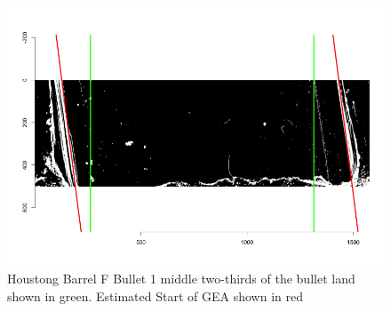 \documentclass[12pt]{article}
\theoremstyle{nonumberplain}
\begin{document}
\begin{figure}[!ht]
  \centering
  \includegraphics[width = .9\textwidth]{../images/Hamby_252_Bullet1_Land3_BestFit}
  \caption{Houstong Barrel F Bullet 1 middle two-thirds of the bullet land shown in green. Estimated Start of GEA shown in red}
  \label{fig: midtwothird}
\end{figure}
\end{document}
